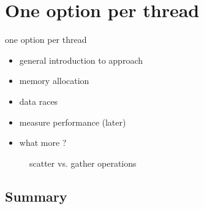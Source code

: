 \chapter{One option per thread}
\label{chapter:oneoptionperthread}
one option per thread
\begin{itemize}
\item general introduction to approach
\item memory allocation
\item data races
\item measure performance (later)
\item what more ?
\end{itemize}


\begin{figure}[H]
    \centering
    \def\svgwidth{0.9\textwidth}
	\caption{scatter vs. gather operations}
    
	\label{fig:scattervsgather}
\end{figure}

\section*{Summary}
